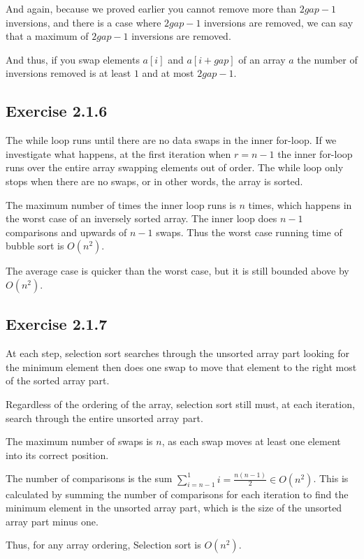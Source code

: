 \documentclass{article}
\begin{document}
And again, because we proved earlier you cannot remove more than \(2gap-1\) inversions, and there is a case where \(2gap-1\) inversions are removed, we can say that a maximum of \(2gap-1\) inversions are removed.

And thus, if you swap elements \(a[i]\) and \(a[i+gap]\) of an array \(a\) the number of inversions removed is at least \(1\) and at most \(2gap-1\).


\subsection*{Exercise 2.1.6}

The while loop runs until there are no data swaps in the inner for-loop. If we investigate what happens, at the first iteration when \(r = n-1\) the inner for-loop runs over the entire array swapping elements out of order. The while loop only stops when there are no swaps, or in other words, the array is sorted.

The maximum number of times the inner loop runs is \(n\) times, which happens in the worst case of an inversely sorted array. The inner loop does \(n-1\) comparisons and upwards of \(n-1\) swaps. Thus the worst case running time of bubble sort is \(O(n^2)\).

The average case is quicker than the worst case, but it is still bounded above by \(O(n^2)\).


\subsection*{Exercise 2.1.7}

At each step, selection sort searches through the unsorted array part looking for the minimum element then does one swap to move that element to the right most of the sorted array part.

Regardless of the ordering of the array, selection sort still must, at each iteration, search through the entire unsorted array part.

The maximum number of swaps is \(n\), as each swap moves at least one element into its correct position.

The number of comparisons is the sum \(\sum_{i=n-1}^1{i}= \frac{n(n-1)}{2} \in O(n^2)\). This is calculated by summing the number of comparisons for each iteration to find the minimum element in the unsorted array part, which is the size of the unsorted array part minus one.

Thus, for any array ordering, Selection sort is \(O(n^2)\).
\end{document}
